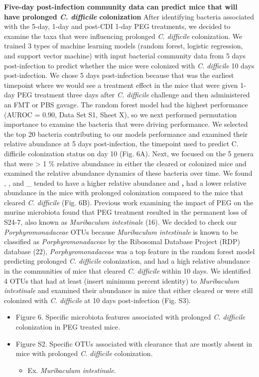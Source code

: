 \documentclass[
  11pt,
]{article}
\providecommand{\tightlist}{%
  \setlength{\itemsep}{0pt}\setlength{\parskip}{0pt}}
\begin{document}
\textbf{Five-day post-infection community data can predict mice that
will have prolonged \emph{C. difficile} colonization} After identifying
bacteria associated with the 5-day, 1-day and post-CDI 1-day PEG
treatments, we decided to examine the taxa that were influencing
prolonged \emph{C. difficile} colonization. We trained 3 types of
machine learning models (random forest, logistic regression, and support
vector machine) with input bacterial community data from 5 days
post-infection to predict whether the mice were colonized with \emph{C.
difficile} 10 days post-infection. We chose 5 days post-infection
because that was the earliest timepoint where we would see a treatment
effect in the mice that were given 1-day PEG treatment three days after
\emph{C. difficile} challenge and then administered an FMT or PBS
gavage. The random forest model had the highest performance (AUROC =
0.90, Data Set S1, Sheet X), so we next performed permutation importance
to examine the bacteria that were driving performance. We selected the
top 20 bacteria contributing to our models performance and examined
their relative abundance at 5 days post-infection, the timepoint used to
predict C. difficile colonization status on day 10 (Fig. 6A). Next, we
focused on the 5 genera that were \textgreater{} 1 \% relative abundance
in either the cleared or colonized mice and examined the relative
abundance dynamics of these bacteria over time. We found \emph{, }, and
\_ tended to have a higher relative abundance and \textbf{, } had a
lower relative abundance in the mice with prolonged colonization
compared to the mice that cleared \emph{C. difficile} (Fig. 6B).
Previous work examining the impact of PEG on the murine microbiota found
that PEG treatment resulted in the permanent loss of S24-7, also known
as \emph{Muribaculum intestinale} (16). We decided to check our
\emph{Porphyromonadaceae} OTUs because \emph{Muribaculum intestinale} is
known to be classified as \emph{Porphyromonadaceae} by the Ribosomal
Database Project (RDP) database (22), \emph{Porphyromonadaceae} was a
top feature in the random forest model predicting prolonged \emph{C.
difficile} colonization, and had a high relative abundance in the
communities of mice that cleared \emph{C. difficile} within 10 days. We
identified 4 OTUs that had at least (insert minimum percent identity) to
\emph{Muribaculum intestinale} and examined their abundance in mice that
either cleared or were still colonized with \emph{C. difficile} at 10
days post-infection (Fig. S3).

\begin{itemize}
\item
  Figure 6. Specific microbiota features associated with prolonged
  \emph{C. difficile} colonization in PEG treated mice.
\item
  Figure S2. Specific OTUs associated with clearance that are mostly
  absent in mice with prolonged \emph{C. difficile} colonization.

  \begin{itemize}
  \tightlist
  \item
    Ex. \emph{Muribaculum intestinale}.
  \end{itemize}
\end{itemize}
\end{document}
